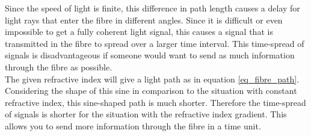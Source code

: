 \documentclass{article}
\begin{document}
Since the speed of light is finite, this difference in path length causes a delay for light rays that enter the fibre in different angles. Since it is difficult or even impossible to get a fully coherent light signal, this causes a signal that is transmitted in the fibre to spread over a larger time interval. This time-spread of signals is disadvantageous if someone would want to send as much information through the fibre as possible. \\
The given refractive index will give a light path as in equation \ref{eq_fibre_path}. Considering the shape of this sine in comparison to the situation with constant refractive index, this sine-shaped path is much shorter. Therefore the time-spread of signals is shorter for the situation with the refractive index gradient. This allows you to send more information through the fibre in a time unit.

{}

\end{document}
